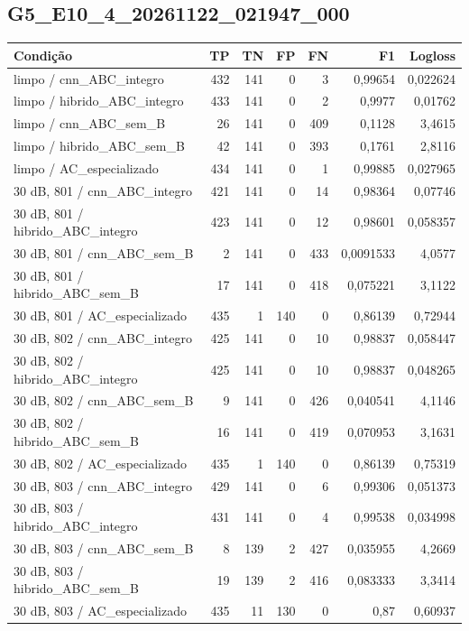 \subsection{G5\_E10\_4\_20261122\_021947\_000}
\small\begin{longtable}{@{}p{.38\linewidth}rrrrrr@{}}
\toprule Condição & TP & TN & FP & FN & F1 & Logloss\\\midrule\endhead
limpo /\allowbreak{} cnn\_ABC\_integro & 432 & 141 & 0 & 3 & 0,99654 & 0,022624\\
limpo /\allowbreak{} hibrido\_ABC\_integro & 433 & 141 & 0 & 2 & 0,9977 & 0,01762\\
limpo /\allowbreak{} cnn\_ABC\_sem\_B & 26 & 141 & 0 & 409 & 0,1128 & 3,4615\\
limpo /\allowbreak{} hibrido\_ABC\_sem\_B & 42 & 141 & 0 & 393 & 0,1761 & 2,8116\\
limpo /\allowbreak{} AC\_especializado & 434 & 141 & 0 & 1 & 0,99885 & 0,027965\\
30 dB, 801 /\allowbreak{} cnn\_ABC\_integro & 421 & 141 & 0 & 14 & 0,98364 & 0,07746\\
30 dB, 801 /\allowbreak{} hibrido\_ABC\_integro & 423 & 141 & 0 & 12 & 0,98601 & 0,058357\\
30 dB, 801 /\allowbreak{} cnn\_ABC\_sem\_B & 2 & 141 & 0 & 433 & 0,0091533 & 4,0577\\
30 dB, 801 /\allowbreak{} hibrido\_ABC\_sem\_B & 17 & 141 & 0 & 418 & 0,075221 & 3,1122\\
30 dB, 801 /\allowbreak{} AC\_especializado & 435 & 1 & 140 & 0 & 0,86139 & 0,72944\\
30 dB, 802 /\allowbreak{} cnn\_ABC\_integro & 425 & 141 & 0 & 10 & 0,98837 & 0,058447\\
30 dB, 802 /\allowbreak{} hibrido\_ABC\_integro & 425 & 141 & 0 & 10 & 0,98837 & 0,048265\\
30 dB, 802 /\allowbreak{} cnn\_ABC\_sem\_B & 9 & 141 & 0 & 426 & 0,040541 & 4,1146\\
30 dB, 802 /\allowbreak{} hibrido\_ABC\_sem\_B & 16 & 141 & 0 & 419 & 0,070953 & 3,1631\\
30 dB, 802 /\allowbreak{} AC\_especializado & 435 & 1 & 140 & 0 & 0,86139 & 0,75319\\
30 dB, 803 /\allowbreak{} cnn\_ABC\_integro & 429 & 141 & 0 & 6 & 0,99306 & 0,051373\\
30 dB, 803 /\allowbreak{} hibrido\_ABC\_integro & 431 & 141 & 0 & 4 & 0,99538 & 0,034998\\
30 dB, 803 /\allowbreak{} cnn\_ABC\_sem\_B & 8 & 139 & 2 & 427 & 0,035955 & 4,2669\\
30 dB, 803 /\allowbreak{} hibrido\_ABC\_sem\_B & 19 & 139 & 2 & 416 & 0,083333 & 3,3414\\
30 dB, 803 /\allowbreak{} AC\_especializado & 435 & 11 & 130 & 0 & 0,87 & 0,60937\\
\bottomrule\end{longtable}\normalsize

